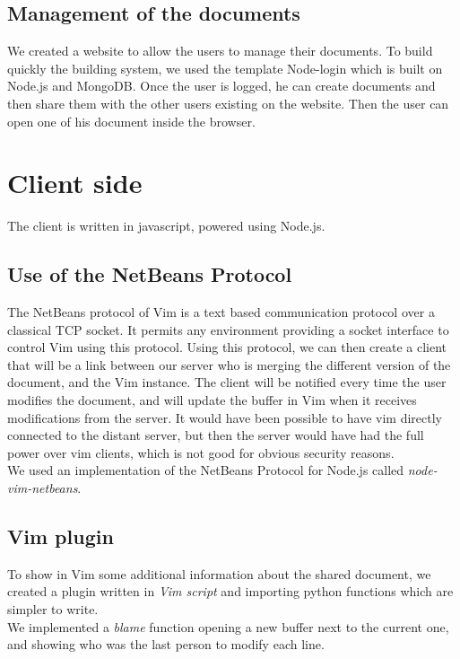 \documentclass{llncs}
\begin{document}
\subsection{Management of the documents}

We created a website to allow the users to manage their documents.
To build quickly the building system, we used the template Node-login which is built
on Node.js and MongoDB.
Once the user is logged, he can create documents and then share them with the other
users existing on the website. Then the user can open one of his document inside the browser.

\section{Client side}\label{sec:Others}

The client is written in javascript, powered using Node.js.\cite{nodejs}

\subsection{Use of the NetBeans Protocol}

The NetBeans protocol of Vim is a text based communication protocol over a
classical TCP socket.
It permits any environment providing a socket interface to control Vim using
this protocol.\cite{netbeans} Using this protocol, we can then create a client
that will be a link between our server who is merging the different version of
the document, and the Vim instance.
The client will be notified every time the user modifies the document, and will
update the buffer in Vim when it receives modifications from the server.
It would have been possible to have vim directly connected to the distant
server, but then the server would have had the full power over vim clients,
which is not good for obvious security reasons.\\
We used an implementation of the NetBeans Protocol for Node.js called
\textit{node-vim-netbeans}.\cite{node-vim-netbeans}

\subsection{Vim plugin}

To show in Vim some additional information about the shared document, we
created a plugin written in \textit{Vim script} and importing python functions
which are simpler to write.\\
We implemented a \textit{blame} function opening a new buffer next to the
current one, and showing who was the last person to modify each line.
\end{document}
